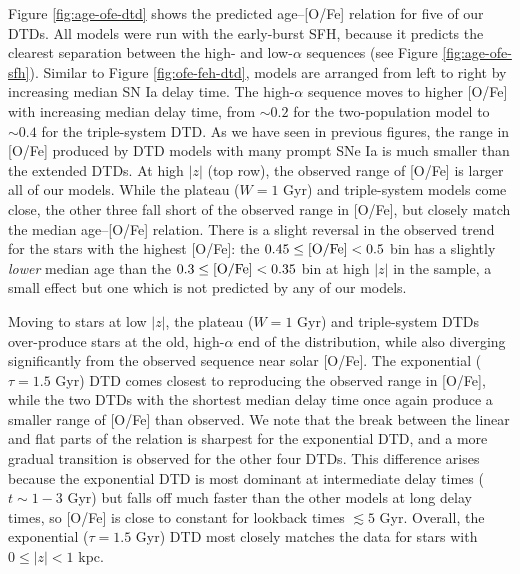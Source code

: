 \documentclass[twocolumn,twocolappendix,linenumbers]{aastex631}
\begin{document}
Figure \ref{fig:age-ofe-dtd} shows the predicted age--[O/Fe] relation for five of our DTDs. All models were run with the early-burst SFH, because it predicts the clearest separation between the high- and low-$\alpha$ sequences (see Figure \ref{fig:age-ofe-sfh}). Similar to Figure \ref{fig:ofe-feh-dtd}, models are arranged from left to right by increasing median SN Ia delay time. The high-$\alpha$ sequence moves to higher [O/Fe] with increasing median delay time, from $\sim0.2$ for the two-population model to $\sim0.4$ for the triple-system DTD. As we have seen in previous figures, the range in [O/Fe] produced by DTD models with many prompt SNe Ia is much smaller than the extended DTDs. At high $|z|$ (top row), the observed range of [O/Fe] is larger all of our models. While the plateau ($W=1$ Gyr) and triple-system models come close, the other three fall short of the observed range in [O/Fe], but closely match the median age--[O/Fe] relation. There is a slight reversal in the observed trend for the stars with the highest [O/Fe]: the $0.45\leq{\rm [O/Fe]}<0.5$ bin has a slightly \textit{lower} median age than the $0.3\leq{\rm [O/Fe]}<0.35$ bin at high $|z|$ in the  sample, a small effect but one which is not predicted by any of our models.

Moving to stars at low $|z|$, the plateau ($W=1$ Gyr) and triple-system DTDs over-produce stars at the old, high-$\alpha$ end of the distribution, while also diverging significantly from the observed sequence near solar [O/Fe]. The exponential ($\tau=1.5$ Gyr) DTD comes closest to reproducing the observed range in [O/Fe], while the two DTDs with the shortest median delay time once again produce a smaller range of [O/Fe] than observed. We note that the break between the linear and flat parts of the relation is sharpest for the exponential DTD, and a more gradual transition is observed for the other four DTDs. This difference arises because the exponential DTD is most dominant at intermediate delay times ($t\sim 1-3$ Gyr) but falls off much faster than the other models at long delay times, so [O/Fe] is close to constant for lookback times $\lesssim 5$ Gyr. Overall, the exponential ($\tau=1.5$ Gyr) DTD most closely matches the data for stars with $0\leq|z|<1$ kpc.
\end{document}
